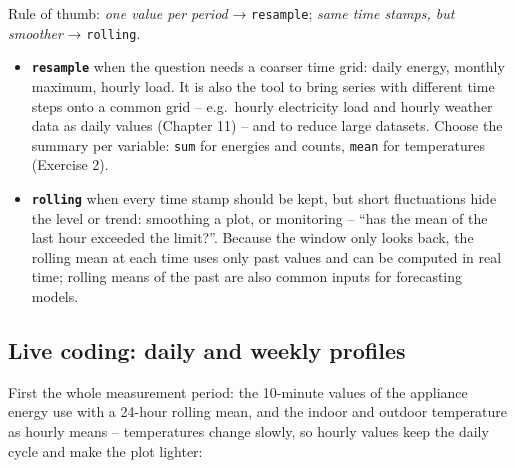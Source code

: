 \documentclass[
  letterpaper,
  DIV=11,
  numbers=noendperiod]{scrreprt}
\providecommand{\tightlist}{%
  \setlength{\itemsep}{0pt}\setlength{\parskip}{0pt}}\usepackage{longtable,booktabs,array}
\begin{document}
\begin{tcolorbox}[enhanced jigsaw, left=2mm, title=\textcolor{quarto-callout-tip-color}{\faLightbulb}\hspace{0.5em}{\texttt{resample} or \texttt{rolling}?}, opacityback=0, breakable, rightrule=.15mm, arc=.35mm, toptitle=1mm, colbacktitle=quarto-callout-tip-color!10!white, opacitybacktitle=0.6, coltitle=black, colframe=quarto-callout-tip-color-frame, bottomrule=.15mm, leftrule=.75mm, bottomtitle=1mm, titlerule=0mm, toprule=.15mm, colback=white]

Rule of thumb: \emph{one value per period} → \texttt{resample};
\emph{same time stamps, but smoother} → \texttt{rolling}.

\begin{itemize}
\tightlist
\item
  \textbf{\texttt{resample}} when the question needs a coarser time
  grid: daily energy, monthly maximum, hourly load. It is also the tool
  to bring series with different time steps onto a common grid --
  e.g.~hourly electricity load and hourly weather data as daily values
  (Chapter 11) -- and to reduce large datasets. Choose the summary per
  variable: \texttt{sum} for energies and counts, \texttt{mean} for
  temperatures (Exercise 2).
\item
  \textbf{\texttt{rolling}} when every time stamp should be kept, but
  short fluctuations hide the level or trend: smoothing a plot, or
  monitoring -- ``has the mean of the last hour exceeded the limit?''.
  Because the window only looks back, the rolling mean at each time uses
  only past values and can be computed in real time; rolling means of
  the past are also common inputs for forecasting models.
\end{itemize}

\end{tcolorbox}

\subsection{Live coding: daily and weekly
profiles}\label{live-coding-daily-and-weekly-profiles}

First the whole measurement period: the 10-minute values of the
appliance energy use with a 24-hour rolling mean, and the indoor and
outdoor temperature as hourly means -- temperatures change slowly, so
hourly values keep the daily cycle and make the plot lighter:
\end{document}
